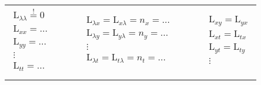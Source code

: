 \begin{enumerate}[itemsep=1ex]
    \begin{tabular}{lllll}
        $\begin{matrix}
        \mathrm{L}_{\lambda \lambda} \stackrel{!}{=} 0\\
        \mathrm{L}_{xx} = \dots\\
        \mathrm{L}_{yy} = \dots\\
        \vdots \\
        \mathrm{L}_{tt} = \dots\\
        \end{matrix}$
        &$\,\,\,\,\,\,\,\,$&
        $\begin{matrix}
        \mathrm{L}_{\lambda x} = \mathrm{L}_{x\lambda} = n_x = \dots\\
        \mathrm{L}_{\lambda y} = \mathrm{L}_{y\lambda} = n_y =\dots\\
        \vdots \\
        \mathrm{L}_{\lambda t} = \mathrm{L}_{t\lambda} = n_t =\dots\\
        \end{matrix}$
        &$\,\,\,\,\,\,\,\,$&
        $\begin{matrix}
        \mathrm{L}_{xy} = \mathrm{L}_{yx}\\
        \mathrm{L}_{xt} = \mathrm{L}_{tx}\\
        \mathrm{L}_{yt} = \mathrm{L}_{ty}\\
        \vdots \\
        \end{matrix}$
    \end{tabular}


\end{enumerate}
